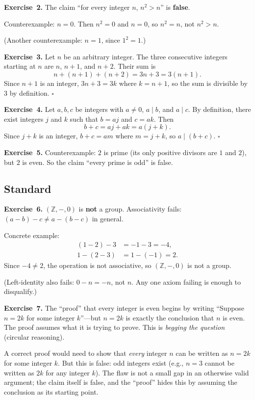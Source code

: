 \documentclass[11pt]{article}
\begin{document}
\medskip
\textbf{Exercise~2.}
The claim ``for every integer $n$, $n^2 > n$'' is \textbf{false}.

Counterexample: $n = 0$. Then $n^2 = 0$ and $n = 0$, so $n^2 = n$, not
$n^2 > n$.

(Another counterexample: $n = 1$, since $1^2 = 1$.)

\medskip
\textbf{Exercise~3.}
Let $n$ be an arbitrary integer. The three consecutive integers starting at $n$ are $n$, $n + 1$, and $n + 2$. Their sum is
\[
  n + (n+1) + (n+2) = 3n + 3 = 3(n + 1).
\]
Since $n + 1$ is an integer, $3n + 3 = 3k$ where $k = n + 1$, so the sum is divisible by $3$ by definition. \hfill$\square$

\medskip
\textbf{Exercise~4.}
Let $a, b, c$ be integers with $a \neq 0$, $a \mid b$, and $a \mid c$. By definition, there exist integers $j$ and $k$ such that $b = aj$ and $c = ak$. Then
\[
  b + c = aj + ak = a(j + k).
\]
Since $j + k$ is an integer, $b + c = am$ where $m = j + k$, so $a \mid (b + c)$. \hfill$\square$

\medskip
\textbf{Exercise~5.}
Counterexample: $2$ is prime (its only positive divisors are $1$ and $2$), but $2$ is even. So the claim ``every prime is odd'' is false.

\subsection*{Standard}

\textbf{Exercise~6.}
$(\mathbb{Z}, -, 0)$ is \textbf{not} a group. Associativity fails:
$(a - b) - c \neq a - (b - c)$ in general.

Concrete example:
\begin{align*}
  (1 - 2) - 3 &= -1 - 3 = -4, \\
  1 - (2 - 3) &= 1 - (-1) = 2.
\end{align*}
Since $-4 \neq 2$, the operation is not associative, so $(\mathbb{Z}, -, 0)$
is not a group.

(Left-identity also fails: $0 - n = -n$, not $n$. Any one axiom failing is enough to disqualify.)

\medskip
\textbf{Exercise~7.}
The ``proof'' that every integer is even begins by writing ``Suppose
$n = 2k$ for some integer $k$''---but $n = 2k$ is exactly the
conclusion that $n$ is even. The proof assumes what it is trying to
prove. This is \emph{begging the question} (circular reasoning).

A correct proof would need to show that \emph{every} integer $n$ can be
written as $n = 2k$ for some integer $k$. But this is false: odd
integers exist (e.g., $n = 3$ cannot be written as $2k$ for any integer
$k$). The flaw is not a small gap in an otherwise valid argument; the
claim itself is false, and the ``proof'' hides this by assuming the
conclusion as its starting point.
\end{document}
